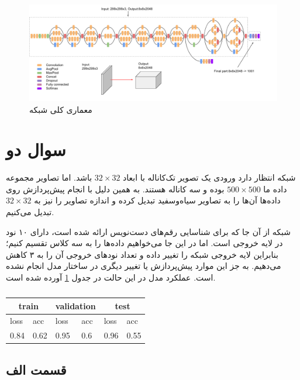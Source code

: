 \documentclass[12pt, a4paper]{article}
\begin{document}
\begin{figure}[h]
    \includegraphics[width=0.8\linewidth]{images/inception/inception}
    \caption{معماری کلی شبکه }
    \label{inception}
\end{figure}

\pagebreak

\section*{سوال دو}

شبکه  انتظار دارد ورودی یک تصویر تک‌کاناله با ابعاد $32 \times 32$ باشد. اما تصاویر مجموعه داده ما
$500 \times 500$ بوده و سه کاناله هستند. به همین دلیل با انجام پیش‌پردازش روی داده‌ها آن‌ها را به تصاویر
سیاه‌وسفید تبدیل کرده و اندازه تصاویر را نیز به $32 \times 32$ تبدیل می‌کنیم.

شبکه  از آن جا که برای شناسایی رقم‌های دست‌نویس ارائه شده است،
دارای ۱۰ نود در لایه خروجی است. اما در این جا می‌خواهیم داده‌ها را به سه کلاس تقسیم کنیم؛ بنابراین لایه خروجی شبکه
را تغییر داده و تعداد نود‌های خروجی آن را به ۳ کاهش می‌دهیم. به جز این موارد پیش‌پردازش یا تغییر دیگری
در ساختار مدل انجام نشده است. عملکرد مدل در این حالت در جدول \ref{lenet_base_result} آورده شده است.

\begin{latin}
\begin{table}[h]
    \centering
    \caption{}
    \label{lenet_base_result}
    \begin{tabular}{l|l||l|l||l|l}
        \multicolumn{2}{c||}{train} & \multicolumn{2}{c||}{validation} & \multicolumn{2}{c}{test} \\ \hline
        loss & acc & loss & acc & loss & acc\\ \hline
        0.84 & 0.62 & 0.95 & 0.6 & 0.96 & 0.55
    \end{tabular}
\end{table}
\end{latin}

\subsection*{قسمت الف}
\end{document}
